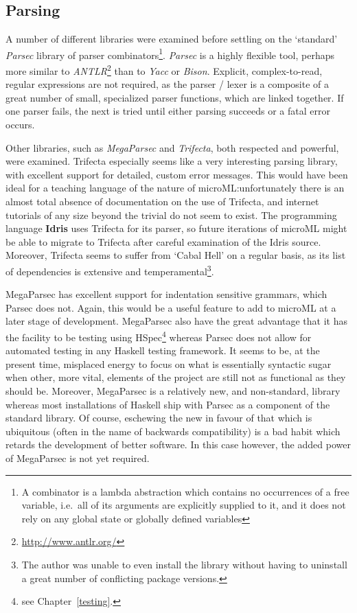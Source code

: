 \documentclass[12pt, a4paper]{report}
\begin{document}
\subsection{Parsing}
A number of different libraries were examined before settling on the `standard' \textit{Parsec}
library of parser combinators\footnote{A combinator is a lambda abstraction which contains no
occurrences of a free variable, i.e.\ all of its arguments are explicitly supplied to it, and it
does not rely on any global state or globally defined variables}. \textit{Parsec} is a highly
flexible tool, perhaps more similar to \textit{ANTLR}\footnote{\url{http://www.antlr.org/}} than
to \textit{Yacc} or \textit{Bison}. Explicit, complex-to-read, regular expressions are not required, as the parser
/ lexer is a composite of a great number of small, specialized parser functions, which are linked
together. If one parser fails, the next is tried until either parsing succeeds or a fatal error
occurs.

Other libraries, such as \textit{MegaParsec} and \textit{Trifecta}, both respected and powerful,
were examined. Trifecta especially seems like a very interesting parsing library, with excellent
support for detailed, custom error messages. This would have been ideal for a teaching language
of the nature of microML:\@ unfortunately there is an almost total absence of documentation on the
use of Trifecta, and internet tutorials of any size beyond the trivial do not seem to exist. The
programming language \textbf{Idris} uses Trifecta for its parser, so future iterations of microML
might be able to migrate to Trifecta after careful examination of the Idris source. Moreover,
Trifecta seems to suffer from `Cabal Hell' on a regular basis, as its list of dependencies is
extensive and temperamental\footnote{The author was unable to even install the library without
having to uninstall a great number of conflicting package versions.}.

MegaParsec has excellent support for indentation sensitive grammars, which Parsec does not. Again,
this would be a useful feature to add to microML at a later stage of development. MegaParsec
also have the great advantage that it has the facility to be testing using HSpec\footnote{see
Chapter~\ref{testing}.} whereas Parsec does not allow for automated testing in any Haskell
testing framework. It seems to be, at the present time, misplaced energy to focus on what
is essentially syntactic sugar when other, more vital, elements of the project are still not
as functional as they should be. Moreover, MegaParsec is a relatively new,
and non-standard, library whereas most installations of Haskell ship with Parsec as a component of
the standard library. Of course, eschewing the new in favour of that which is ubiquitous (often
in the name of backwards compatibility) is a bad habit which retards the development of better
software. In this case however, the added power of MegaParsec is not yet required.
\end{document}
